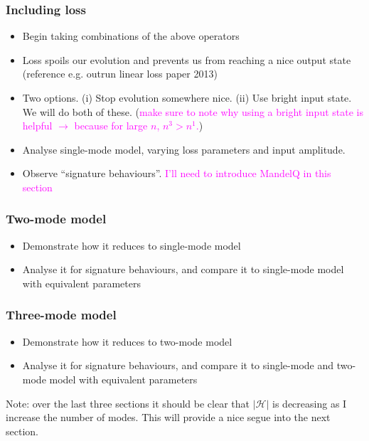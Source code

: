 \documentclass{article}
\def\MT #1{\textcolor{magenta}{#1}}
\begin{document}
\subsubsection*{Including loss}
\begin{itemize}
\item Begin taking combinations of the above operators
\item Loss spoils our evolution and prevents us from reaching a nice output state (reference e.g. outrun linear loss paper 2013)
\item Two options. (i) Stop evolution somewhere nice. (ii) Use bright input state. We will do both of these. (\MT{make sure to note why using a bright input state is helpful $\rightarrow$ because for large $n$, $n^3 > n^1$.})
\item Analyse single-mode model, varying loss parameters and input amplitude. 
\item Observe ``signature behaviours''.  \MT{I'll need to introduce MandelQ in this section}
\end{itemize}

\subsubsection*{Two-mode model}
\begin{itemize}
\item Demonstrate how it reduces to single-mode model
\item Analyse it for signature behaviours, and compare it to single-mode model with equivalent parameters
\end{itemize}

\subsubsection*{Three-mode model}
\begin{itemize}
\item Demonstrate how it reduces to two-mode model
\item Analyse it for signature behaviours, and compare it to single-mode and two-mode model with equivalent parameters
\end{itemize}
Note: over the last three sections it should be clear that $\left|\mathcal{H}\right|$ is decreasing as I increase the number of modes. This will provide a nice segue into the next section.
\end{document}
